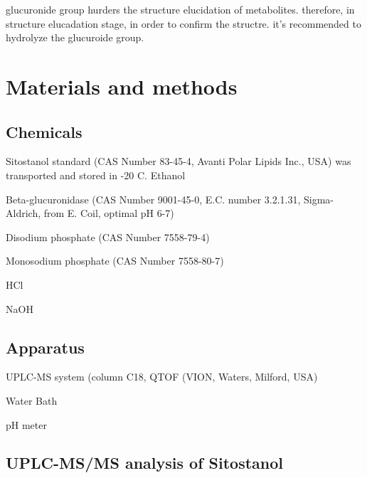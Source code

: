 glucuronide group hurders the structure elucidation of metabolites.
therefore, in structure elucadation stage, in order to confirm the structre. it's recommended to hydrolyze the glucuroide group.
\section{Materials and methods}
\subsection{Chemicals}
Sitostanol standard (CAS Number 83-45-4, Avanti Polar Lipids Inc., USA) was transported and stored in -20 \degree C. Ethanol

Beta-glucuronidase (CAS Number 9001-45-0, E.C. number 3.2.1.31, Sigma-Aldrich, from E. Coil, optimal pH 6-7)

Disodium phosphate (CAS Number 7558-79-4)

Monosodium phosphate (CAS Number 7558-80-7)

HCl

NaOH

\subsection{Apparatus}
UPLC-MS system (column C18, QTOF (VION, Waters, Milford, USA)

Water Bath

pH meter

\subsection{UPLC-MS/MS analysis of Sitostanol}

